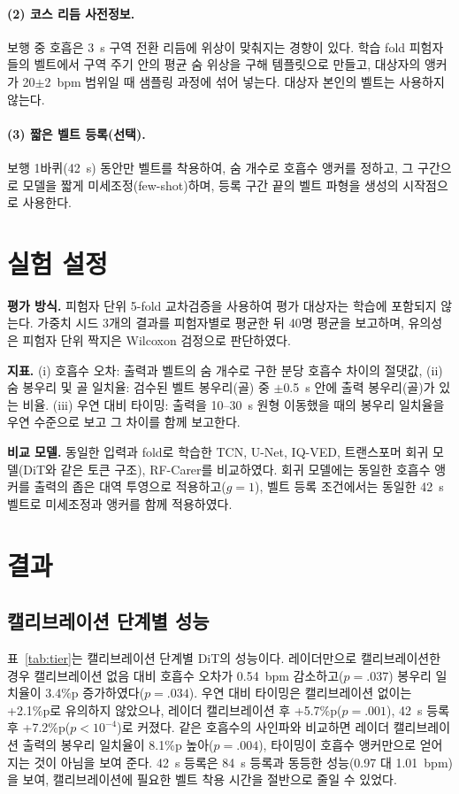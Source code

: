 \documentclass{article}
\begin{document}
\paragraph{(2) 코스 리듬 사전정보.}
보행 중 호흡은 3~s 구역 전환 리듬에 위상이 맞춰지는 경향이 있다. 학습 fold 피험자들의 벨트에서 구역 주기 안의 평균 숨 위상을 구해 템플릿으로 만들고,
대상자의 앵커가 20$\pm$2~bpm 범위일 때 샘플링 과정에 섞어 넣는다. 대상자 본인의 벨트는 사용하지 않는다.

\paragraph{(3) 짧은 벨트 등록(선택).}
보행 1바퀴(42~s) 동안만 벨트를 착용하여, 숨 개수로 호흡수 앵커를 정하고, 그 구간으로 모델을 짧게 미세조정(few-shot)하며, 등록 구간 끝의 벨트 파형을 생성의 시작점으로 사용한다.

\section{실험 설정}
\textbf{평가 방식.} 피험자 단위 5-fold 교차검증을 사용하여 평가 대상자는 학습에 포함되지 않는다. 가중치 시드 3개의 결과를 피험자별로 평균한 뒤 40명 평균을 보고하며, 유의성은 피험자 단위 짝지은 Wilcoxon 검정으로 판단하였다.

\textbf{지표.} (i) 호흡수 오차: 출력과 벨트의 숨 개수로 구한 분당 호흡수 차이의 절댓값, (ii) 숨 봉우리 및 골 일치율: 검수된 벨트 봉우리(골) 중 $\pm$0.5~s 안에 출력 봉우리(골)가 있는 비율.
(iii) 우연 대비 타이밍: 출력을 10--30~s 원형 이동했을 때의 봉우리 일치율을 우연 수준으로 보고 그 차이를 함께 보고한다.

\textbf{비교 모델.} 동일한 입력과 fold로 학습한 TCN, U-Net, IQ-VED, 트랜스포머 회귀 모델(DiT와 같은 토큰 구조), RF-Carer를 비교하였다.
회귀 모델에는 동일한 호흡수 앵커를 출력의 좁은 대역 투영으로 적용하고($g{=}1$), 벨트 등록 조건에서는 동일한 42~s 벨트로 미세조정과 앵커를 함께 적용하였다.

\section{결과}
\subsection{캘리브레이션 단계별 성능}
표~\ref{tab:tier}는 캘리브레이션 단계별 DiT의 성능이다.
레이더만으로 캘리브레이션한 경우 캘리브레이션 없음 대비 호흡수 오차가 0.54~bpm 감소하고($p{=}.037$) 봉우리 일치율이 3.4\%p 증가하였다($p{=}.034$).
우연 대비 타이밍은 캘리브레이션 없이는 +2.1\%p로 유의하지 않았으나, 레이더 캘리브레이션 후 +5.7\%p($p{=}.001$), 42~s 등록 후 +7.2\%p($p<10^{-4}$)로 커졌다.
같은 호흡수의 사인파와 비교하면 레이더 캘리브레이션 출력의 봉우리 일치율이 8.1\%p 높아($p{=}.004$), 타이밍이 호흡수 앵커만으로 얻어지는 것이 아님을 보여 준다.
42~s 등록은 84~s 등록과 동등한 성능(0.97 대 1.01~bpm)을 보여, 캘리브레이션에 필요한 벨트 착용 시간을 절반으로 줄일 수 있었다.
\end{document}
